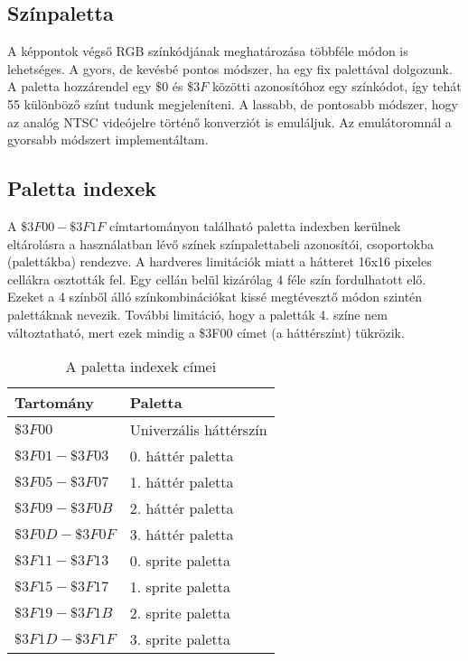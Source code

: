 \subsection{Színpaletta}

A képpontok végső RGB színkódjának meghatározása többféle módon is lehetséges. A gyors, de kevésbé pontos módszer, ha egy fix palettával dolgozunk. A paletta hozzárendel egy $\$0$ és $\$3F$ közötti azonosítóhoz egy színkódot, így tehát 55 különböző színt tudunk megjeleníteni. A lassabb, de pontosabb módszer, hogy az analóg NTSC videójelre történő konverziót is emuláljuk. Az emulátoromnál a gyorsabb módszert implementáltam.
\iffalse
\vspace{0.3cm}
\begin{figure}[H]
	\centering
	\texttt{[image: palette.png]}
	\caption{A 2C02 színpalettája}
\end{figure}
\clearpage
\fi

\subsection{Paletta indexek}

A $\$3F00 - \$3F1F$ címtartományon található paletta indexben kerülnek eltárolásra a használatban lévő színek színpalettabeli azonosítói, csoportokba (palettákba) rendezve. A hardveres limitációk miatt a hátteret 16x16 pixeles cellákra osztották fel. Egy cellán belül kizárólag 4 féle szín fordulhatott elő. Ezeket a 4 színből álló színkombinációkat kissé megtévesztő módon szintén palettáknak nevezik. További limitáció, hogy a paletták 4. színe nem változtatható, mert ezek mindig a \$3F00 címet (a háttérszínt) tükrözik.

\begin{table}[H]
	\centering
	\begin{tabular}{ | l | l | }
		\hline
		Tartomány & Paletta \\
		\hline			
		$ \$3F00 $ & Univerzális háttérszín \\
		$ \$3F01 - \$3F03 $ & 0. háttér paletta \\
		$ \$3F05 - \$3F07 $ & 1. háttér paletta \\
		$ \$3F09 - \$3F0B $ & 2. háttér paletta \\
		$ \$3F0D - \$3F0F $ & 3. háttér paletta \\
		$ \$3F11 - \$3F13 $ & 0. sprite paletta \\
		$ \$3F15 - \$3F17 $ & 1. sprite paletta \\
		$ \$3F19 - \$3F1B $ & 2. sprite paletta \\
		$ \$3F1D - \$3F1F $ & 3. sprite paletta \\
		\hline
	\end{tabular}
	\caption{A paletta indexek címei}
	\label{fig:paletteram}
\end{table}

